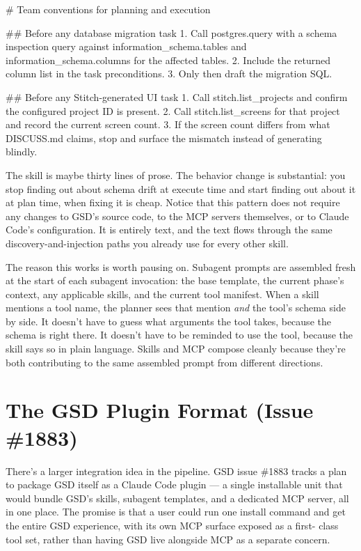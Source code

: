 \documentclass[11pt,letterpaper,openany]{book}
\begin{document}
\begin{gsdplain}
# Team conventions for planning and execution

## Before any database migration task
1. Call postgres.query with a schema inspection query
   against information_schema.tables and information_schema.columns
   for the affected tables.
2. Include the returned column list in the task preconditions.
3. Only then draft the migration SQL.

## Before any Stitch-generated UI task
1. Call stitch.list_projects and confirm the configured project
   ID is present.
2. Call stitch.list_screens for that project and record the
   current screen count.
3. If the screen count differs from what DISCUSS.md claims, stop
   and surface the mismatch instead of generating blindly.
\end{gsdplain}

The skill is maybe thirty lines of prose. The behavior change is
substantial: you stop finding out about schema drift at execute
time and start finding out about it at plan time, when fixing it
is cheap. Notice that this pattern does not require any changes to
GSD's source code, to the MCP servers themselves, or to Claude
Code's configuration. It is entirely text, and the text flows
through the same discovery-and-injection paths you already use for
every other skill.

The reason this works is worth pausing on. Subagent prompts are
assembled fresh at the start of each subagent invocation: the base
template, the current phase's context, any applicable skills, and
the current tool manifest. When a skill mentions a tool name, the
planner sees that mention \emph{and} the tool's schema side by
side. It doesn't have to guess what arguments the tool takes,
because the schema is right there. It doesn't have to be reminded
to use the tool, because the skill says so in plain language.
Skills and MCP compose cleanly because they're both contributing
to the same assembled prompt from different directions.

\section{The GSD Plugin Format (Issue \#1883)}

There's a larger integration idea in the pipeline. GSD issue \#1883
tracks a plan to package GSD itself as a Claude Code plugin --- a
single installable unit that would bundle GSD's skills, subagent
templates, and a dedicated MCP server, all in one place. The
promise is that a user could run one install command and get the
entire GSD experience, with its own MCP surface exposed as a first-
class tool set, rather than having GSD live alongside MCP as a
separate concern.
\end{document}
